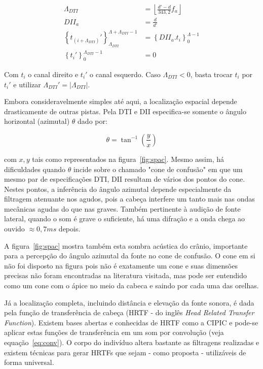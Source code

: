 \begin{equation}\label{eq:locImpl}
\begin{split}
\Lambda_{DTI} & = \left \lfloor \frac{d'-d}{343,2}  f_a \right \rfloor \\
DII_a & = \frac{d}{d'} \\
\left\{t_{(i+\Lambda_{DTI})}'\right\}_{\Lambda_{DTI}}^{\Lambda+\Lambda_{DTI}-1} & =\left\{DII_a . t_i\right\}_0^{\Lambda-1} \\
\left\{t_i'\right\}_0^{\Lambda_{DTI}-1} & = 0
\end{split}
\end{equation}

Com $t_i$ o canal direito e $t_i'$ o canal esquerdo. Caso $\Lambda_{DTI} < 0 $, basta trocar $t_i$ por $t_i'$  e utilizar $\Lambda_{DTI}'= | \Lambda_{DTI} | $.

Embora consideravelmente simples até aqui, a localização espacial depende drasticamente de outras pistas. Pela
DTI e DII especifica-se somente o ângulo horizontal (azimutal) $\theta$ dado por:

\begin{equation}\label{eq:angulo}
\theta=\tan^{-1}\left ( \frac{y}{ x }  \right )
\end{equation}

com $x,y$ tais como representados na figura~\ref{fig:spac}. Mesmo assim, há dificuldades quando $\theta$ incide sobre o chamado "cone de confusão" em que um mesmo par de especificações DTI, DII resultam de vários dos pontos 
do cone. Nestes pontos, a inferência do ângulo azimutal depende especialmente da filtragem atenuante nos agudos, pois a cabeça interfere um tanto mais nas ondas mecânicas agudas do que nas graves.\cite{Heeger,hrtf}  Também pertinente à audição de fonte lateral, quando o som é grave o suficiente, há uma difração e a onda chega ao ouvido $\approx 0,7ms$ depois.\cite{floEsp}

A figura~\ref{fig:spac} mostra também esta sombra acústica do crânio, importante para a percepção do ângulo azimutal da fonte no cone de confusão. O cone em si não foi disposto na figura pois não é exatamente um cone e suas dimensões precisas não foram encontradas na literatura visitada, mas pode ser entendido como um cone com o ápice no meio da cabeca e saindo por cada uma das orelhas.\cite{hrtf}

Já a localização completa, incluindo distância e elevação da fonte sonora, é dada pela função de transferência de cabeça (HRTF - do inglês \emph{Head Related Transfer Function}).\cite{hrtf} Existem bases abertas e conhecidas de HRTF como a CIPIC e pode-se aplicar estas funções de transferência em um som por convolução (veja equação~\ref{eq:conv}).\cite{CIPIC} O corpo do indivíduo altera bastante as filtragens realizadas e existem técnicas para gerar HRTFs que sejam - como proposta - utilizáveis de forma universal.\cite{lazaSPA} 

